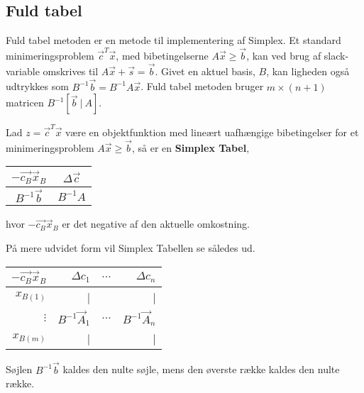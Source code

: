 \subsection{Fuld tabel}
Fuld tabel metoden er en metode til implementering af Simplex. Et standard minimeringsproblem $\vec{c}^T\vec{x}$, med bibetingelserne $A\vec{x} \geq \vec{b}$, kan ved brug af slack-variable omskrives til $A\vec{x}+\vec{s}=\vec{b}$. Givet en aktuel basis, $B$, kan ligheden også udtrykkes som  $B^{-1}\vec{b}=B^{-1}A\vec{x}$. Fuld tabel metoden bruger $m \times (n+1)$ matricen $B^{-1}[\vec{b} \ | \ A]$.\\

\begin{defn}
Lad $z=\vec{c}^T\vec{x}$ være en objektfunktion med lineært uafhængige bibetingelser for et minimeringsproblem $A\vec{x} \geq \vec{b}$, så er en \textbf{Simplex Tabel},\\
\begin{center}
\begin{tabular}{| c | c |}
  \hline
  $-\vec{c_B}\vec{x}_B$&$\Delta\vec{c}$ \\ \hline			
  $B^{-1}\vec{b}$ & $B^{-1}A$ \\ \hline
\end{tabular}
\end{center}
hvor $-\vec{c_B}\vec{x}_B$ er det negative af den aktuelle omkostning. 
\end{defn}


På mere udvidet form vil Simplex Tabellen se således ud.
\begin{center}
\begin{tabular}{| r|r r r|}
  \hline	
  $-\vec{c_B}\vec{x}_B$&$\Delta c_1 $ & $\dots$ &$\Delta c_n$\\ \hline	
  $x_{B(1)}$ &	| & & |\\	
  $\vdots$  & $B^{-1}\vec{A}_1$ & $\hdots$ & $B^{-1}\vec{A}_n$\\
   $x_{B(m)}$ &	| & & |\\
   \hline
\end{tabular}
\end{center}
Søjlen $B^{-1}\vec{b}$ kaldes den nulte søjle, mens den øverste række kaldes den nulte række.


